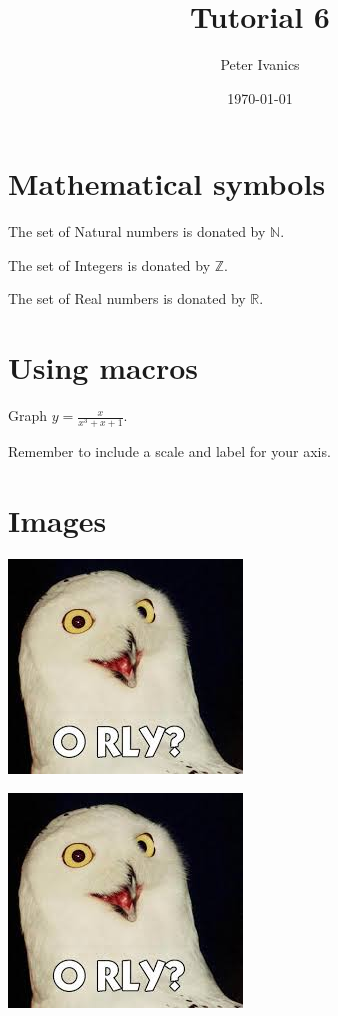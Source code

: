 \documentclass[11]{article}
\def\eq1{y=\frac{x}{x^3 + x + 1}} %
\def\labelaxis{Remember to include a scale and label for your axis.} %
\begin{document}
	\title{Tutorial 6}
	\author{Peter Ivanics}
	\date{\today}
	\maketitle
	
	\section{Mathematical symbols}
	The set of Natural numbers is donated by $\mathbb{N}$.
	
	The set of Integers is donated by $\mathbb{Z}$.
	
	The set of Real numbers is donated by $\mathbb{R}$.
	
	\section{Using macros}
	Graph $ \eq1 $.
	
	\labelaxis
	
	\section{Images} %
	\begin{center} 
		\includegraphics{orly.jpg}
	
		\includegraphics[scale=0.5, angle=45]{orly.jpg}
	\end{center}
\end{document}
